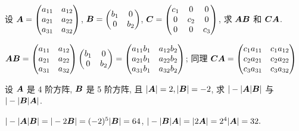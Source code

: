 \begin{example}
    设 $\vb*{A}=\begin{pmatrix}
            a_{11} & a_{12} \\
            a_{21} & a_{22} \\
            a_{31} & a_{32} \\
        \end{pmatrix}$,
    $\vb*{B}=\begin{pmatrix}
            b_1 & 0   \\
            0   & b_2
        \end{pmatrix}$,
    $\vb*{C}=\begin{pmatrix}
            c_1 & 0   & 0   \\
            0   & c_2 & 0   \\
            0   & 0   & c_3
        \end{pmatrix}$, 求 $\vb*{AB}$ 和 $\vb*{CA}$.
\end{example}
\begin{solution}
    $\vb*{AB}=\begin{pmatrix}
            a_{11} & a_{12} \\
            a_{21} & a_{22} \\
            a_{31} & a_{32} \\
        \end{pmatrix}\begin{pmatrix}
            b_1 & 0   \\
            0   & b_2
        \end{pmatrix}=\begin{pmatrix}
            a_{11}b_1 & a_{12}b_2 \\
            a_{21}b_1 & a_{22}b_2 \\
            a_{31}b_1 & a_{32}b_2
        \end{pmatrix}$; 同理
    $\vb*{CA}=\begin{pmatrix}
            c_1a_{11} & c_1a_{12} \\
            c_2a_{21} & c_2a_{22} \\
            c_3a_{31} & c_3a_{32}
        \end{pmatrix}$
\end{solution}

\begin{example}
    设 $\vb*{A}$ 是 4 阶方阵, $\vb*{B}$ 是 5 阶方阵, 且 $|\vb*{A}|=2,|\vb*{B}|=-2$, 求 $|-|\vb*{A}|\vb*{B}|$ 与 $|-|\vb*{B}|\vb*{A}|$.
\end{example}
\begin{solution}
    $|-|\vb*{A}|\vb*{B}|=|-2\vb*{B}|=(-2)^{5}|\vb*{B}|=64$, $|-|\vb*{B}|\vb*{A}|=|2\vb*{A}|=2^4|\vb*{A}|=32.$
\end{solution}

